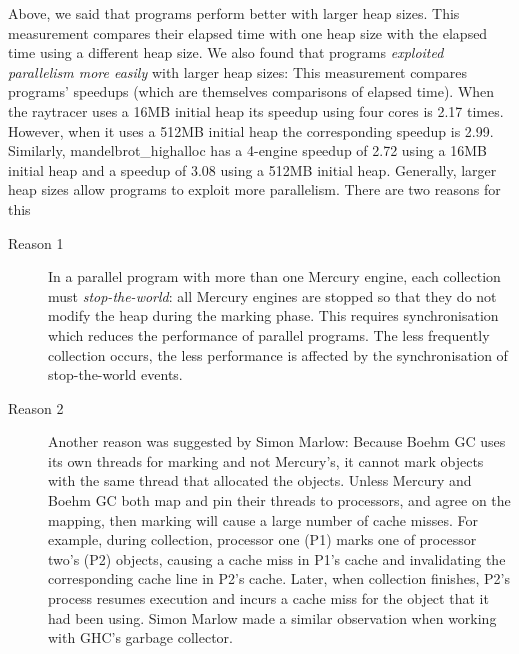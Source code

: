 Above, we said that programs perform better with larger heap sizes.
This measurement compares their elapsed time with one heap
size with the elapsed time using a different heap size.
We also found that programs \emph{exploited parallelism more easily} with
larger heap sizes:
This measurement compares programs' speedups (which are themselves
comparisons of elapsed time).
When the raytracer uses a 16MB initial heap its speedup using four
cores is 2.17 times.
However, when it uses a 512MB initial heap the corresponding speedup is
2.99.
Similarly,
mandelbrot\_highalloc has a 4-engine speedup of 2.72 using a 16MB initial
heap and a speedup of 3.08 using a 512MB initial heap.
Generally,
larger heap sizes allow programs to exploit more parallelism.
There are two reasons for this

\begin{description}

    \item[Reason 1]
    In a parallel program with more than one Mercury engine,
    each collection must \emph{stop-the-world}:
    all Mercury engines are stopped so that they do not modify the heap during
    the marking phase.
    This requires synchronisation which reduces the performance of parallel
    programs.
    The less frequently collection occurs, the less performance is affected
    by the synchronisation of stop-the-world events.

    \item[Reason 2]
    Another reason was suggested by Simon Marlow:
    Because Boehm GC uses its own threads for marking and not Mercury's,
    it cannot mark objects with the same thread that allocated the objects.
    Unless Mercury and Boehm GC both map and pin their threads to
    processors,
    and agree on the mapping,
    then marking will cause a large number of cache misses.
    For example, during collection, processor one (P1) marks one of processor
    two's
    (P2) objects,
    causing a cache miss in P1's cache and invalidating the corresponding cache
    line in P2's cache.
    Later, when collection finishes,
    P2's process resumes execution and incurs a cache miss for the object that
    it had been using.
    Simon Marlow made a similar observation when working with GHC's garbage
    collector.

\end{description}

